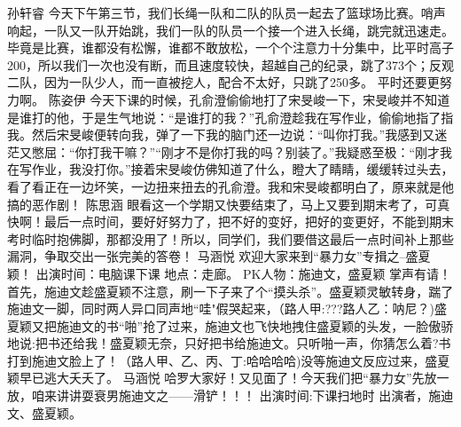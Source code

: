 {}孙轩睿\markdownRendererInterblockSeparator
{}今天下午第三节，我们长绳一队和二队的队员一起去了篮球场比赛。哨声响起，一队又一队开始跳，我们一队的队员一个接一个进入长绳，跳完就迅速走。毕竟是比赛，谁都没有松懈，谁都不敢放松，一个个注意力十分集中，比平时高子200\markdownRendererPercentSign{}，所以我们一次也没有断，而且速度较快，超越自己的纪录，跳了373个；反观二队，因为一队少人，而一直被挖人，配合不太好，只跳了250多。\markdownRendererInterblockSeparator
{}平时还要更努力啊。\markdownRendererInterblockSeparator
{}\markdownRendererInterblockSeparator
{}陈姿伊\markdownRendererInterblockSeparator
{}今天下课的时候，孔俞澄偷偷地打了宋旻峻一下，宋旻峻并不知道是谁打的他，于是生气地说：“是谁打的我？”孔俞澄趁我在写作业，偷偷地指了指我。然后宋旻峻便转向我，弹了一下我的脑门还一边说：“叫你打我。”我感到又迷茫又憋屈：“你打我干嘛？”“刚才不是你打我的吗？别装了。”我疑惑至极：“刚才我在写作业，我没打你。”接着宋旻峻仿佛知道了什么，瞪大了睛睛，缓缓转过头去，看了看正在一边坏笑，一边扭来扭去的孔俞澄。我和宋旻峻都明白了，原来就是他搞的恶作剧！\markdownRendererInterblockSeparator
{}\markdownRendererInterblockSeparator
{}陈思涵\markdownRendererInterblockSeparator
{}眼看这一个学期又快要结束了，马上又要到期末考了，可真快啊！最后一点时间，要好好努力了，把不好的变好，把好的变更好，不能到期末考时临时抱佛脚，那都没用了！所以，同学们，我们要借这最后一点时间补上那些漏洞，争取交出一张完美的答卷！\markdownRendererInterblockSeparator
{}\markdownRendererInterblockSeparator
{}马涵悦\markdownRendererInterblockSeparator
{}欢迎大家来到“暴力女”专揖之--盛夏颖！\markdownRendererInterblockSeparator
{}出演时间：电脑课下课 地点：走廊。\markdownRendererInterblockSeparator
{}PK人物：施迪文，盛夏颖 掌声有请！ \markdownRendererInterblockSeparator
{}首先，施迪文趁盛夏颖不注意，刷一下子来了个“摸头杀”。盛夏颖灵敏转身，踹了施迪文一脚，同时两人异口同声地“哇"假哭起来，（路人甲:???路人乙：呐尼？)盛夏颖又把施迪文的书“啪”抢了过来，施迪文也飞快地拽住盛夏颖的头发，一脸傲骄地说:把书还给我！盛夏颖无奈，只好把书给施迪文。只听啪一声，你猜怎么着?书打到施迪文脸上了！（路人甲、乙、丙、丁:哈哈哈哈)没等施迪文反应过来，盛夏颖早已逃大夭夭了。 \markdownRendererInterblockSeparator
{}\markdownRendererInterblockSeparator
{}马涵悦\markdownRendererInterblockSeparator
{}哈罗大家好！又见面了！今天我们把“暴力女”先放一放，咱来讲讲耍衰男施迪文之——滑铲！！！\markdownRendererInterblockSeparator
{}出演时间:下课扫地时 出演者，施迪文、盛夏颖。 \markdownRendererInterblockSeparator
